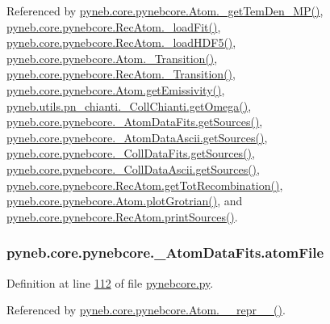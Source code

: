 Referenced by \hyperlink{pynebcore_8py_source_l02046}{pyneb.\-core.\-pynebcore.\-Atom.\-\_\-get\-Tem\-Den\-\_\-\-M\-P()}, \hyperlink{pynebcore_8py_source_l02754}{pyneb.\-core.\-pynebcore.\-Rec\-Atom.\-\_\-load\-Fit()}, \hyperlink{pynebcore_8py_source_l02714}{pyneb.\-core.\-pynebcore.\-Rec\-Atom.\-\_\-load\-H\-D\-F5()}, \hyperlink{pynebcore_8py_source_l01433}{pyneb.\-core.\-pynebcore.\-Atom.\-\_\-\-Transition()}, \hyperlink{pynebcore_8py_source_l02812}{pyneb.\-core.\-pynebcore.\-Rec\-Atom.\-\_\-\-Transition()}, \hyperlink{pynebcore_8py_source_l01782}{pyneb.\-core.\-pynebcore.\-Atom.\-get\-Emissivity()}, \hyperlink{pn__chianti_8py_source_l00507}{pyneb.\-utils.\-pn\-\_\-chianti.\-\_\-\-Coll\-Chianti.\-get\-Omega()}, \hyperlink{pynebcore_8py_source_l00190}{pyneb.\-core.\-pynebcore.\-\_\-\-Atom\-Data\-Fits.\-get\-Sources()}, \hyperlink{pynebcore_8py_source_l00460}{pyneb.\-core.\-pynebcore.\-\_\-\-Atom\-Data\-Ascii.\-get\-Sources()}, \hyperlink{pynebcore_8py_source_l00690}{pyneb.\-core.\-pynebcore.\-\_\-\-Coll\-Data\-Fits.\-get\-Sources()}, \hyperlink{pynebcore_8py_source_l01022}{pyneb.\-core.\-pynebcore.\-\_\-\-Coll\-Data\-Ascii.\-get\-Sources()}, \hyperlink{pynebcore_8py_source_l02851}{pyneb.\-core.\-pynebcore.\-Rec\-Atom.\-get\-Tot\-Recombination()}, \hyperlink{pynebcore_8py_source_l02443}{pyneb.\-core.\-pynebcore.\-Atom.\-plot\-Grotrian()}, and \hyperlink{pynebcore_8py_source_l02912}{pyneb.\-core.\-pynebcore.\-Rec\-Atom.\-print\-Sources()}.

\hypertarget{classpyneb_1_1core_1_1pynebcore_1_1___atom_data_fits_add12b2ae3c11a68438ebf4bcf79fd6d0}{
\subsubsection[{atom\-File}]{\setlength{\rightskip}{0pt plus 5cm}pyneb.\-core.\-pynebcore.\-\_\-\-Atom\-Data\-Fits.\-atom\-File}}\label{classpyneb_1_1core_1_1pynebcore_1_1___atom_data_fits_add12b2ae3c11a68438ebf4bcf79fd6d0}


Definition at line \hyperlink{pynebcore_8py_source_l00112}{112} of file \hyperlink{pynebcore_8py_source}{pynebcore.\-py}.



Referenced by \hyperlink{pynebcore_8py_source_l02615}{pyneb.\-core.\-pynebcore.\-Atom.\-\_\-\-\_\-repr\-\_\-\-\_\-()}.

